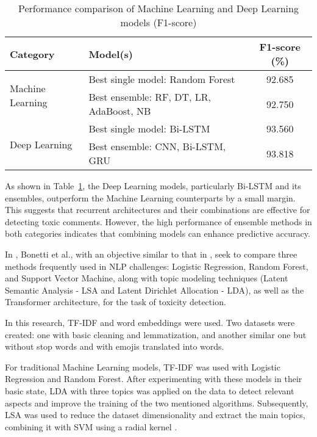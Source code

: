\begin{table}[!t]
\caption{Performance comparison of Machine Learning and Deep Learning models (F1-score)}
\label{tab:results}
\centering
\begin{tabularx}{\linewidth}{|l|X|c|}
\hline
\textbf{Category} & \textbf{Model(s)} & \textbf{F1-score (\%)} \\ \hline
\multirow{2}{*}{Machine Learning} 
  & Best single model: Random Forest & 92.685 \\ \cline{2-3}
  & Best ensemble: RF, DT, LR, AdaBoost, NB & 92.750 \\ \hline
\multirow{2}{*}{Deep Learning} 
  & Best single model: Bi-LSTM & 93.560 \\ \cline{2-3}
  & Best ensemble: CNN, Bi-LSTM, GRU & 93.818 \\ \hline
\end{tabularx}
\end{table}

\vspace{0.5em}

As shown in Table~\ref{tab:results}, the Deep Learning models, particularly Bi-LSTM and its ensembles, outperform the Machine Learning counterparts by a small margin. This suggests that recurrent architectures and their combinations are effective for detecting toxic comments. However, the high performance of ensemble methods in both categories indicates that combining models can enhance predictive accuracy.

In \cite{bonetti2023comparison}, Bonetti et al., with an objective similar to that in \cite{fieri2023offensive}, seek to compare three methods frequently used in NLP challenges: Logistic Regression, Random Forest, and Support Vector Machine, along with topic modeling techniques (Latent Semantic Analysis - LSA and Latent Dirichlet Allocation - LDA), as well as the Transformer architecture, for the task of toxicity detection.

In this research, TF-IDF and word embeddings were used. Two datasets were created: one with basic cleaning and lemmatization, and another similar one but without stop words and with emojis translated into words.

For traditional Machine Learning models, TF-IDF was used with Logistic Regression and Random Forest. After experimenting with these models in their basic state, LDA with three topics was applied on the data to detect relevant aspects and improve the training of the two mentioned algorithms. Subsequently, LSA was used to reduce the dataset dimensionality and extract the main topics, combining it with SVM using a radial kernel \cite{bonetti2023comparison}.

